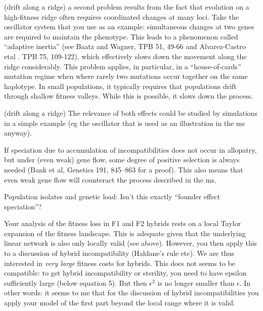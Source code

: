 \reply{
}

\begin{point}{(drift along a ridge)}
    a second problem results from the fact that evolution on a high-fitness ridge
  often requires coordinated changes at many loci. Take the oscillator system
that you use as an example: simultaneous changes at two genes are required to
maintain the phenotype. This leads to a phenomenon called ``adaptive inertia''
(see Baatz and Wagner, TPB 51, 49-66 and Alvarez-Castro etal . TPB 75, 109-122),
which effectively slows down the movement along the ridge considerably. This
problem applies, in particular, in a ``house-of-cards'' mutation regime when
where rarely two mutations occur together on the same haplotype. In small
populations, it typically requires that populations drift through shallow
fitness valleys. While this is possible, it slows down the process.  
\end{point}

\reply{
}

\begin{point}{(drift along a ridge)}
    The relevance of both effects could be studied by simulations in a simple
example (eg the oscillator that is used as an illustration in the ms anyway).
\end{point}

\reply{
}

\begin{point}{}
    If speciation due to accumulation of incompatibilities does not occur in
allopatry, but under (even weak) gene flow, some degree of positive selection
is always needed (Bank et al, Genetics 191, 845–863 for a proof). This also
means that even weak gene flow will counteract the process described in the ms.
\end{point}

\reply{
}

\begin{point}{}
    Population isolates and genetic load: Isn't this exactly ``founder effect
speciation''?
\end{point}

\reply{
}

\begin{point}{}
    Your analysis of the fitness loss in F1 and F2 hybrids rests on a local
Taylor expansion of the fitness landscape. This is adequate given that the
underlying linear network is also only locally valid (see above). However, you
then apply this to a discussion of hybrid incompatibility (Haldane's rule etc).
We are thus interested in \emph{very large} fitness costs for hybrids. This does not
seems to be compatible: to get hybrid incompatibility or sterility, you need to
have epsilon sufficiently large (below equation 5). But then $\epsilon^2$ is no
longer smaller than $\epsilon$. In other words: it seems to me that for the
discussion of hybrid incompatibilities you apply your model of the first part
beyond the local range where it is valid.
\end{point}

